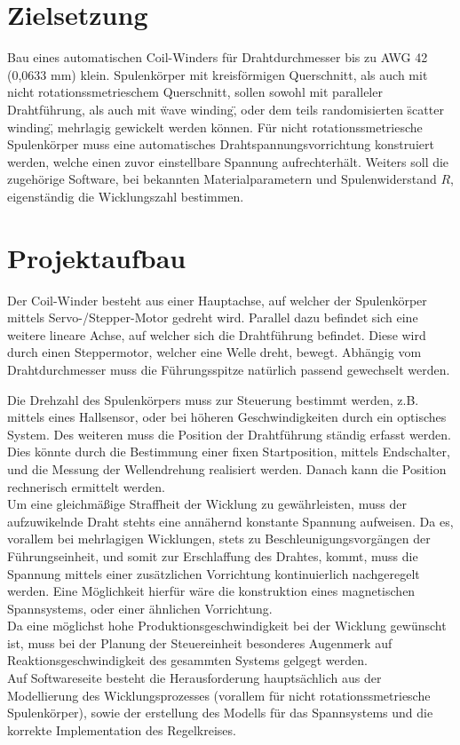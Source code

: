 \section*{Zielsetzung}
Bau eines automatischen Coil-Winders für Drahtdurchmesser bis zu AWG 42 (0,0633 mm) klein. Spulenkörper mit kreisförmigen Querschnitt, als auch mit nicht rotationssmetrieschem Querschnitt, sollen sowohl mit paralleler Drahtführung, als auch mit \"wave winding\", oder dem teils randomisierten \"scatter winding\", mehrlagig gewickelt werden können. Für nicht rotationssmetriesche Spulenkörper muss eine automatisches Drahtspannungsvorrichtung konstruiert werden, welche einen zuvor einstellbare Spannung aufrechterhält. Weiters soll die zugehörige Software, bei bekannten Materialparametern und Spulenwiderstand $R$, eigenständig die Wicklungszahl bestimmen.  

\section*{Projektaufbau}

Der Coil-Winder besteht aus einer Hauptachse, auf welcher der Spulenkörper mittels Servo-/Stepper-Motor gedreht wird. Parallel dazu befindet sich eine weitere lineare Achse, auf welcher sich die Drahtführung befindet. Diese wird durch einen Steppermotor, welcher eine Welle dreht, bewegt. Abhängig vom Drahtdurchmesser muss die Führungsspitze natürlich passend gewechselt werden. 

Die Drehzahl des Spulenkörpers muss zur Steuerung bestimmt werden, z.B. mittels eines Hallsensor, oder bei höheren Geschwindigkeiten durch ein optisches System. Des weiteren muss die Position der Drahtführung ständig erfasst werden. Dies könnte durch die Bestimmung einer fixen Startposition, mittels Endschalter, und die Messung der Wellendrehung realisiert werden. Danach kann die Position rechnerisch ermittelt werden. 
\\ 
Um eine gleichmäßige Straffheit der Wicklung zu gewährleisten, muss der aufzuwikelnde Draht stehts eine annähernd konstante Spannung aufweisen. Da es, vorallem bei mehrlagigen Wicklungen, stets zu Beschleunigungsvorgängen der Führungseinheit, und somit zur Erschlaffung des Drahtes, kommt, muss die Spannung mittels einer zusätzlichen Vorrichtung kontinuierlich nachgeregelt werden. Eine Möglichkeit hierfür wäre die konstruktion eines magnetischen Spannsystems, oder einer ähnlichen Vorrichtung.\\
Da eine möglichst hohe Produktionsgeschwindigkeit bei der Wicklung gewünscht ist, muss bei der Planung der Steuereinheit besonderes Augenmerk auf Reaktionsgeschwindigkeit des gesammten Systems gelgegt werden.\\
Auf Softwareseite besteht die Herausforderung hauptsächlich aus der Modellierung des Wicklungsprozesses (vorallem für nicht rotationssmetriesche Spulenkörper), sowie der erstellung des Modells für das Spannsystems und die korrekte Implementation des Regelkreises.\\ 
\\


